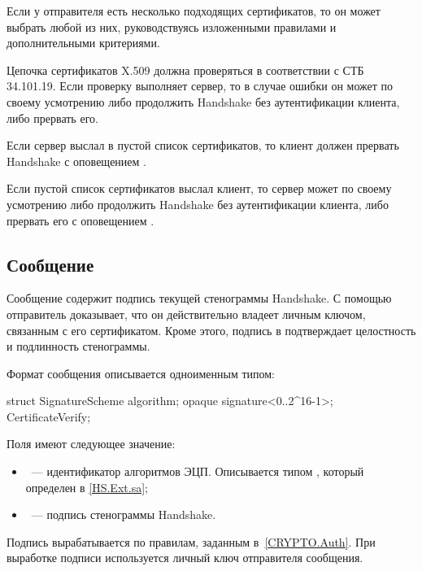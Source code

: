 Если у отправителя  есть несколько подходящих 
сертификатов, то он может выбрать любой из них, руководствуясь изложенными 
правилами и дополнительными критериями.

Цепочка сертификатов X.509 должна проверяться в соответствии с СТБ 34.101.19. 
%
Если проверку выполняет сервер, то в случае ошибки он может по своему 
усмотрению либо продолжить Handshake без аутентификации клиента, либо прервать 
его.

Если сервер выслал в  пустой список сертификатов,
то клиент должен прервать Handshake с оповещением 
.  

Если пустой список сертификатов выслал клиент, то сервер может по своему 
усмотрению либо продолжить Handshake без аутентификации клиента, либо прервать 
его с оповещением . 

\subsection{Сообщение }\label{HS.CV} 

Сообщение  содержит подпись текущей стенограммы 
Handshake. С помощью  отправитель доказывает, что он
действительно владеет личным ключом, связанным с его сертификатом. Кроме этого, 
подпись в  подтверждает целостность и подлинность 
стенограммы. 

Формат сообщения  описывается одноименным типом:

\begin{codeblock}
struct {
  SignatureScheme algorithm;
  opaque signature<0..2^16-1>;
} CertificateVerify;
\end{codeblock}

Поля  имеют следующее значение:
%
\begin{itemize}
\item 
{}~--- идентификатор алгоритмов ЭЦП. Описывается типом 
, который определен в \ref{HS.Ext.sa};
\item 
{}~--- подпись стенограммы Handshake.
\end{itemize}

Подпись вырабатывается по правилам, заданным в~\ref{CRYPTO.Auth}.
При выработке подписи используется личный ключ отправителя сообщения.

